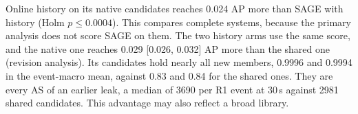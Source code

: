 Online history on its native candidates reaches 0.024 AP more than SAGE with history (Holm $p \leq 0.0004$).
This compares complete systems, because the primary analysis does not score SAGE on them.
The two history arms use the same score, and the native one reaches 0.029 [0.026, 0.032] AP more than the shared one (revision analysis).
Its candidates hold nearly all new members, 0.9996 and 0.9994 in the event-macro mean, against 0.83 and 0.84 for the shared ones.
They are every AS of an earlier leak, a median of \num{3690} per R1 event at 30\,s against \num{2981} shared candidates.
This advantage may also reflect a broad library.

